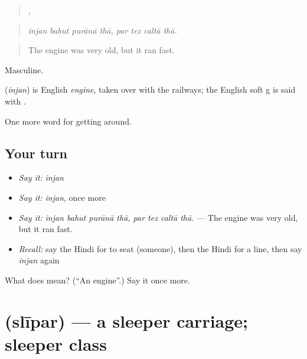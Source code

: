 \begin{quote}
   ,    
\end{quote}

\begin{quote}
\emph{injan bahut purānā thā, par tez caltā thā.}
\end{quote}

\begin{quote}
The engine was very old, but it ran fast.
\end{quote}

Masculine.

\begin{cousinweb}
\textbf{} (\emph{injan}) is English \emph{engine}, taken over with the railways; the English soft g is said with .
\end{cousinweb}

\begin{grammarlens}[title={What you've built}]
One more word for getting around.
\end{grammarlens}

\subsection*{Your turn}
\begin{itemize}
\raggedright
  \item \emph{Say it:} \emph{injan}
  \item \emph{Say it:} \emph{injan}, once more
  \item \emph{Say it:} \emph{injan bahut purānā thā, par tez caltā thā.} — The engine was very old, but it ran fast.
  \item \emph{Recall:} say the Hindi for to seat (someone), then the Hindi for a line, then say \emph{injan} again
\end{itemize}

\begin{tcolorbox}[breakable,colback=teal!4,colframe=teal!35!black,title={Before you move on}]
What does  mean? (\textquotedblleft{}An engine\textquotedblright{}.) Say it once more.
\end{tcolorbox}
\section[\texorpdfstring{\hi{स्लीपर} (slīpar)}{स्लीपर (slīpar)}]{ (slīpar) — a sleeper carriage; sleeper class}

